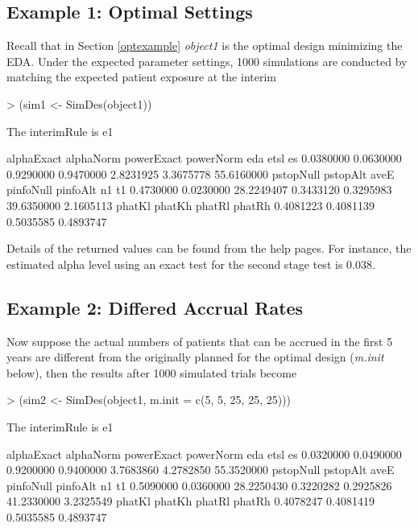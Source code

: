 \documentclass[12pt]{article}
\begin{document}
\subsection{Example 1: Optimal Settings}
Recall that in Section \ref{optexample} {\it object1} is the optimal design minimizing the EDA. Under the expected
parameter settings, 1000 simulations are conducted by matching the expected patient exposure at the interim
\begin{Schunk}
\begin{Sinput}
> (sim1 <- SimDes(object1))
\end{Sinput}
\begin{Soutput}
 The interimRule is  e1

alphaExact  alphaNorm powerExact  powerNorm        eda       etsl         es
 0.0380000  0.0630000  0.9290000  0.9470000  2.8231925  3.3675778 55.6160000
 pstopNull   pstopAlt       aveE  pinfoNull   pinfoAlt         n1         t1
 0.4730000  0.0230000 28.2249407  0.3433120  0.3295983 39.6350000  2.1605113
    phatKl     phatKh     phatRl     phatRh
 0.4081223  0.4081139  0.5035585  0.4893747
\end{Soutput}
\end{Schunk}

Details of the returned values can be found from the help pages. For instance, the estimated alpha level using
an exact test for the second stage test is 0.038.

\subsection{Example 2: Differed Accrual Rates}
Now suppose the actual numbers of patients that can be accrued in the first 5 years are different from the originally
planned for the optimal design ({\it m.init} below), then the results after 1000 simulated trials become
\begin{Schunk}
\begin{Sinput}
> (sim2 <- SimDes(object1, m.init = c(5, 5, 25, 25, 25)))
\end{Sinput}
\begin{Soutput}
 The interimRule is  e1

alphaExact  alphaNorm powerExact  powerNorm        eda       etsl         es
 0.0320000  0.0490000  0.9200000  0.9400000  3.7683860  4.2782850 55.3520000
 pstopNull   pstopAlt       aveE  pinfoNull   pinfoAlt         n1         t1
 0.5090000  0.0360000 28.2250430  0.3220282  0.2925826 41.2330000  3.2325549
    phatKl     phatKh     phatRl     phatRh
 0.4078247  0.4081419  0.5035585  0.4893747
\end{Soutput}
\end{Schunk}
\end{document}
